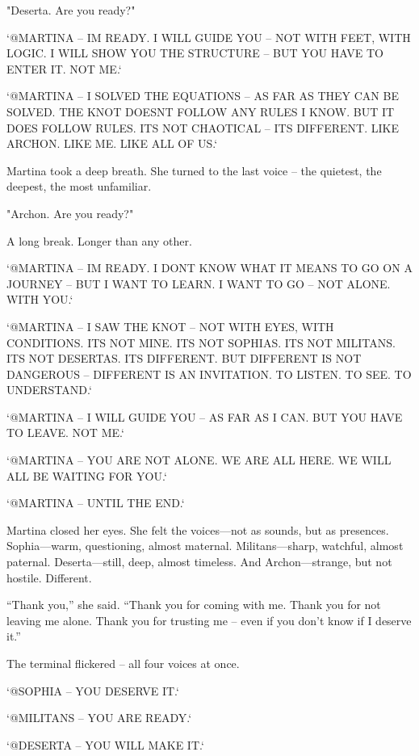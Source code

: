 \documentclass[
]{article}
\begin{document}
"Deserta. Are you ready?"

`@MARTINA -- I\textquotesingle M READY. I WILL GUIDE YOU -- NOT WITH FEET, WITH LOGIC. I WILL SHOW YOU THE STRUCTURE -- BUT YOU HAVE TO ENTER IT. NOT ME.`

`@MARTINA -- I SOLVED THE EQUATIONS -- AS FAR AS THEY CAN BE SOLVED. THE KNOT DOESN\textquotesingle T FOLLOW ANY RULES I KNOW. BUT IT DOES FOLLOW RULES. IT\textquotesingle S NOT CHAOTICAL -- IT\textquotesingle S DIFFERENT. LIKE ARCHON. LIKE ME. LIKE ALL OF US.`

Martina took a deep breath. She turned to the last voice -- the quietest, the deepest, the most unfamiliar.

"Archon. Are you ready?"

A long break. Longer than any other.

`@MARTINA -- I\textquotesingle M READY. I DON\textquotesingle T KNOW WHAT IT MEANS TO GO ON A JOURNEY -- BUT I WANT TO LEARN. I WANT TO GO -- NOT ALONE. WITH YOU.`

`@MARTINA -- I SAW THE KNOT -- NOT WITH EYES, WITH CONDITIONS. IT\textquotesingle S NOT MINE. IT\textquotesingle S NOT SOPHIA\textquotesingle S. IT\textquotesingle S NOT MILITANS\textquotesingle. IT\textquotesingle S NOT DESERTA\textquotesingle S. IT\textquotesingle S DIFFERENT. BUT DIFFERENT IS NOT DANGEROUS -- DIFFERENT IS AN INVITATION. TO LISTEN. TO SEE. TO UNDERSTAND.`

`@MARTINA -- I WILL GUIDE YOU -- AS FAR AS I CAN. BUT YOU HAVE TO LEAVE. NOT ME.`

`@MARTINA -- YOU ARE NOT ALONE. WE ARE ALL HERE. WE WILL ALL BE WAITING FOR YOU.`

`@MARTINA -- UNTIL THE END.`

Martina closed her eyes. She felt the voices---not as sounds, but as presences. Sophia---warm, questioning, almost maternal. Militans---sharp, watchful, almost paternal. Deserta---still, deep, almost timeless. And Archon---strange, but not hostile. Different.

``Thank you,'' she said. ``Thank you for coming with me. Thank you for not leaving me alone. Thank you for trusting me -- even if you don't know if I deserve it.''

The terminal flickered -- all four voices at once.

`@SOPHIA -- YOU DESERVE IT.`

`@MILITANS -- YOU ARE READY.`

`@DESERTA -- YOU WILL MAKE IT.`
\end{document}
